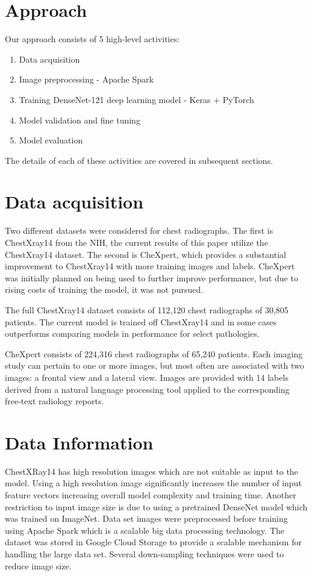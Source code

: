 \documentclass{amia}
\begin{document}
\section*{Approach}

Our approach consists of 5 high-level activities:
\begin{enumerate}
\item Data acquisition
\item Image preprocessing - Apache Spark
\item Training DenseNet-121 deep learning model - Keras + PyTorch
\item Model validation and fine tuning
\item Model evaluation
\end{enumerate}

The details of each of these activities are covered in subsequent sections.

\section*{Data acquisition}
Two different datasets were considered for chest radiographs. The first is ChestXray14 from the NIH, the current results of this paper utilize the ChestXray14 dataset. The second is CheXpert, which provides a substantial improvement to ChestXray14 with more training images and labels. CheXpert was initially planned on being used to further improve performance, but due to rising costs of training the model, it was not pursued.

The full ChestXray14 dataset consists of 112,120 chest radiographs of 30,805 patients. The current model is trained off ChestXray14 and in some cases outperforms comparing models in performance for select pathologies.

CheXpert\cite{ref2} consists of 224,316 chest radiographs of 65,240 patients. Each imaging study can pertain to one or more images, but most often are associated with two images: a frontal view and a lateral view. Images are provided with 14 labels derived from a natural language processing tool applied to the corresponding free-text radiology reports.

\section*{Data Information}

ChestXRay14 has high resolution images which are not suitable as input to the model. Using a high resolution image significantly increases the number of input feature vectors increasing overall model complexity and training time. Another restriction to input image size is due to using a pretrained DenseNet model which was trained on ImageNet. Data set images were preprocessed before training using Apache Spark which is a scalable big data processing technology. The dataset was stored in Google Cloud Storage to provide a scalable mechanism for handling the large data set. Several down-sampling techniques were used to reduce image size.
\end{document}
